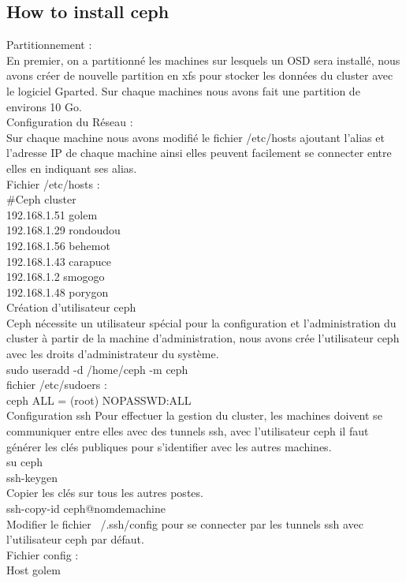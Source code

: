 \documentclass{article}
\begin{document}
	\subsection{How to install ceph}
	Partitionnement :
	\\En premier, on a partitionné les machines sur lesquels un OSD sera installé, nous avons créer de nouvelle partition en xfs pour stocker les données du cluster avec le logiciel Gparted. Sur chaque machines nous avons fait une partition de environs 10 Go.
	\\Configuration du Réseau :
	\\Sur chaque machine nous avons modifié le fichier /etc/hosts ajoutant l'alias et l'adresse IP de chaque machine ainsi elles peuvent facilement se connecter entre elles en indiquant ses alias.
\\Fichier /etc/hosts :
\\\#Ceph cluster
\\192.168.1.51 golem
\\192.168.1.29 rondoudou
\\192.168.1.56 behemot
\\192.168.1.43 carapuce
\\192.168.1.2 smogogo
\\192.168.1.48 porygon
\\Création d'utilisateur ceph
\\Ceph nécessite un utilisateur spécial pour la configuration et l'administration du cluster à partir de la machine d'administration, nous avons crée l'utilisateur ceph avec les droits d'administrateur du système.
\\ sudo useradd -d /home/ceph -m ceph
\\fichier /etc/sudoers :
\\ceph ALL = (root) NOPASSWD:ALL
\\Configuration ssh
Pour effectuer la gestion du cluster, les machines doivent se communiquer entre
elles avec des tunnels ssh, avec l'utilisateur ceph il faut générer les clés publiques pour s'identifier avec les autres machines.
\\su ceph
\\ssh-keygen
\\Copier les clés sur tous les autres postes.
\\ssh-copy-id ceph@nomdemachine
\\ Modifier le fichier ~/.ssh/config pour se connecter par les tunnels ssh avec l'utilisateur ceph par défaut.
\\Fichier config :
\\Host golem
\end{document}
